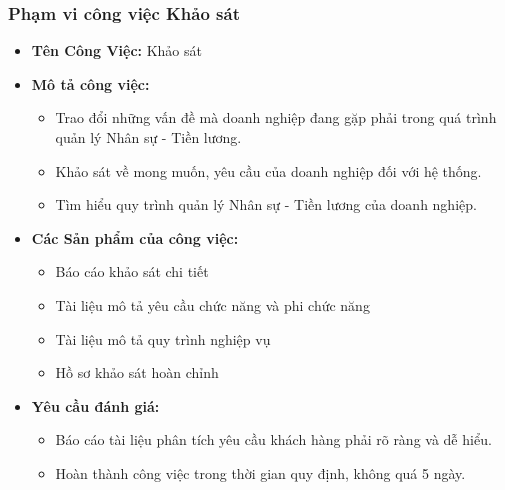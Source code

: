 \subsubsection{Phạm vi công việc Khảo sát}
\begin{itemize}
    \item \textbf{Tên Công Việc:} Khảo sát
    \item \textbf{Mô tả công việc:}
          \begin{itemize}
              \item Trao đổi những vấn đề mà doanh nghiệp đang gặp phải trong quá trình quản lý Nhân sự - Tiền lương.
              \item Khảo sát về mong muốn, yêu cầu của doanh nghiệp đối với hệ thống.
              \item Tìm hiểu quy trình quản lý Nhân sự - Tiền lương của doanh nghiệp.
          \end{itemize}
    \item \textbf{Các Sản phẩm của công việc:}
          \begin{itemize}
              \item Báo cáo khảo sát chi tiết
              \item Tài liệu mô tả yêu cầu chức năng và phi chức năng
              \item Tài liệu mô tả quy trình nghiệp vụ
              \item Hồ sơ khảo sát hoàn chỉnh
          \end{itemize}
    \item \textbf{Yêu cầu đánh giá:}
          \begin{itemize}
              \item Báo cáo tài liệu phân tích yêu cầu khách hàng phải rõ ràng và dễ hiểu.
              \item Hoàn thành công việc trong thời gian quy định, không quá 5 ngày.
          \end{itemize}
\end{itemize}


